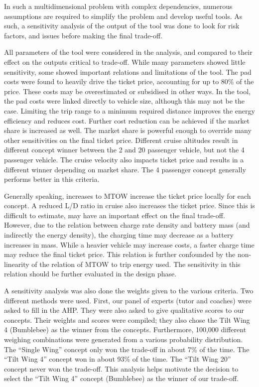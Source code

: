 In such a multidimensional problem with complex dependencies, numerous assumptions are required to simplify the problem and develop useful tools. As such, a sensitivity analysis of the output of the tool was done to look for risk factors, and issues before making the final trade-off.

All parameters of the tool were considered in the analysis, and compared to their effect on the outputs critical to trade-off. While many parameters showed little sensitivity, some showed important relations and limitations of the tool. The pad costs were found to heavily drive the ticket price, accounting for up to 80\% of the price. These costs may be overestimated or subsidised in other ways. In the tool, the pad costs were linked directly to vehicle size, although this may not be the case. Limiting the trip range to a minimum required distance improves the energy efficiency and reduces cost. Further cost reduction can be achieved if the market share is increased as well. The market share is powerful enough to override many other sensitivities on the final ticket price. Different cruise altitudes result in different concept winner between the 2 and 20 passenger vehicle, but not the 4 passenger vehicle. The cruise velocity also impacts ticket price and results in a different winner depending on market share. The 4 passenger concept generally performs better in this criteria. 

Generally speaking, increases to MTOW increase the ticket price locally for each concept. A reduced L/D ratio in cruise also increases the ticket price. Since this is difficult to estimate, may have an important effect on the final trade-off. However, due to the relation between charge rate density and battery mass (and indirectly the energy density), the charging time may decrease as a battery increases in mass. While a heavier vehicle may increase costs, a faster charge time may reduce the final ticket price. This relation is further confounded by the non-linearity of the relation of MTOW to trip energy used. The sensitivity in this relation should be further evaluated in the design phase.

A sensitivity analysis was also done the weights given to the various criteria. Two different methods were used. First, our panel of experts (tutor and coaches) were asked to fill in the AHP. They were also asked to give qualitative scores to our concepts. Their weights and scores were compiled; they also chose the Tilt Wing 4 (Bumblebee) as the winner from the concepts. Furthermore, 100,000 different weighing combinations were generated from a various probability distribution. The “Single Wing” concept only won the trade-off in about 7\% of the time. The “Tilt Wing 4” concept won in about 93\% of the time. The “Tilt Wing 20” concept never won the trade-off. This analysis helps motivate the decision to select the “Tilt Wing 4” concept (Bumblebee) as the winner of our trade-off. 

